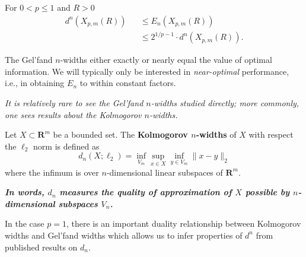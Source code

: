 \begin{theorem}
    For $0<p \leq 1$ and $R>0$
    \begin{eqnarray}
        d^n(X_{p,m}(R))&&\leq E_n(X_{p,m}(R)) \\
        \label{eq3.1.4}
        &&\leq 2^{1/p-1} \cdot d^n(X_{p,m}(R)).
        \label{eq3.1.5}
    \end{eqnarray}
    \label{th3,3}
\end{theorem}

The Gel'fand $n$-widths either exactly or nearly equal the value of optimal information. We will typically only be interested in \emph{near-optimal} performance, i.e., in obtaining $E_n$ to within constant factors.

\emph{\textcolor[rgb]{1,0,0}{It is relatively rare to see the Gel'fand $n$-widths studied directly; more commonly, one sees results about the Kolmogorov $n$-widths.}}

\begin{definition}
    \label{def3.1.2}
    Let $X \subset \mathbf{R}^m$ be a bounded set. The \textbf{Kolmogorov $n$-widths} of $X$ with respect the $\ell_2$ norm is defined as 
    \begin{equation*}
        d_n(X;\ell_2) = \inf\limits_{V_m}\sup\limits_{x \in X}\inf\limits_{y \in V_m} \|x-y\|_2
    \end{equation*}
    where the infimum is over $n$-dimensional linear subspaces of $\mathbf{R}^m$.
\end{definition}

\emph{\textbf{\textcolor[rgb]{1,0,0}{In words, $d_n$ measures the quality of approximation of $X$ possible by $n$-dimensional subspaces $V_n$.}}}

In the case $p=1$, there is an important duality relationship between Kolmogorov widths and Gel'fand widths which allows us to infer properties of $d^n$ from published results on $d_n$. 

